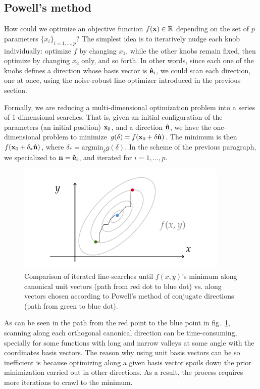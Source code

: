 \subsection{Powell's method}
How could we optimize an objective function $f(\vb{x})\in\mathbb{R}$ depending on the set of $p$ parameters $\{x_i\}_{i=1,\dots,p}$? The simplest idea is to iteratively nudge each knob individually: optimize $f$ by changing $x_1$, while the other knobs remain fixed, then optimize by changing $x_2$ only, and so forth. In other words, since each one of the knobs defines a direction whose basis vector is $\vu{e}_i$, we could scan each direction, one at once, using the noise-robust line-optimizer introduced in the previous section.

Formally, we are reducing a multi-dimensional optimization problem into a series of 1-dimensional searches. That is, given an initial configuration of the parameters (an initial position) $\vb{x}_0$, and a direction $\vu{n}$, we have the one-dimensional problem to minimize $g(\delta)=f(\vb{x}_0 + \delta \vu{n})$. The minimum is  then $f(\vb{x}_0 + \delta_* \vu{n})$, where $\delta_* = \text{argmin}_\delta g(\delta)$. In the scheme of the previous paragraph, we specialized to $\vb{n}=\vu{e}_i$, and iterated for $i=1,\dots, p$.

\begin{figure}[htb]
    \centering
    \includegraphics[width=0.9\textwidth]{Images/powell_loop.pdf}
    \caption[Comparison of iterated line-searches until $f(x,y)$'s minimum along canonical unit vectors vs. along vectors chosen according to Powell's method.]{Comparison of iterated line-searches until $f(x,y)$'s minimum along canonical unit vectors (path from red dot to blue dot) vs. along vectors chosen according to Powell's method of conjugate directions (path from green to blue dot).}
    \label{fig:powell}
\end{figure}

As can be seen in the path from the red point to the blue point in fig.~\ref{fig:powell}, scanning along each orthogonal canonical direction can be time-consuming, specially for some functions with long and narrow valleys at some angle with the coordinates basis vectors.
The reason why using unit basis vectors can be so inefficient is because optimizing along a given basis vector spoils down the prior minimization carried out in other directions. As a result, the process requires more iterations to crawl to the minimum.

